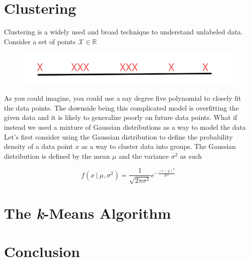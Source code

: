 \documentclass[english,course]{Notes}
\begin{document}
\section{Clustering}

Clustering is a widely used and broad technique to understand unlabeled data. Consider a set of points $\mathcal{X} \in \mathbb{R}$
\begin{figure}[H]
  \centerline{\includegraphics[width=0.7\linewidth]{fig1.png}}
\end{figure}

As you could imagine, you could use a say degree five polynomial to closely fit the data points. The downside being this complicated model is overfitting the given data and it is likely to generalize poorly on future data points. What if instead we used a mixture of Gaussian distributions as a way to model the data \\ 

 Let's first consider using the Gaussian distribution to define the probability density of a data point $x$ as a way to cluster data into groups. The Gaussian distribution is defined by the mean $\mu$ and the variance $\sigma^2$ as such

\begin{equation}
\label{eq:transition1}
f(x \ \vert \ \mu , \sigma^2) = \frac{1}{\sqrt{2 \pi \sigma^2}} e^{-\frac{(x - \mu)^2}{2 \sigma^2}}
\end{equation}



\section{The \textit{k}-Means Algorithm}

\section{Conclusion}
\end{document}
